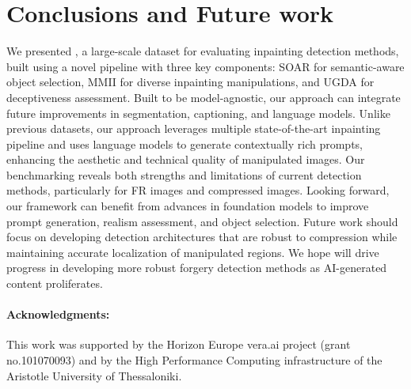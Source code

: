 \section{Conclusions and Future work}
\label{sec:conclusions}

We presented \emph{\datasetname}, a large-scale dataset for evaluating inpainting detection methods, built using a novel pipeline with three key components: SOAR for semantic-aware object selection, MMII for diverse inpainting manipulations, and UGDA for deceptiveness assessment. Built to be model-agnostic, our approach can integrate future improvements in segmentation, captioning, and language models.
Unlike previous datasets, our approach leverages multiple state-of-the-art inpainting pipeline and uses language models to generate contextually rich prompts, enhancing the aesthetic and technical quality of manipulated images.
Our benchmarking reveals both strengths and limitations of current detection methods, particularly for FR images and compressed images. Looking forward, our framework can benefit from advances in foundation models to improve prompt generation, realism assessment, and object selection. Future work should focus on developing detection architectures that are robust to compression while maintaining accurate localization of manipulated regions. We hope \emph{\datasetname} will drive progress in developing more robust forgery detection methods as AI-generated content proliferates.
\vspace{-14pt} 
\paragraph{Acknowledgments:} This work was supported by the Horizon Europe vera.ai project (grant no.101070093) and by the High Performance Computing infrastructure of the Aristotle University of Thessaloniki.
